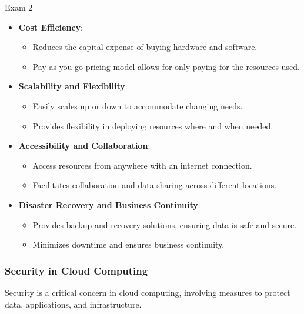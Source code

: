 \begin{examnotes}{Exam 2}
\begin{highlight}
        \begin{itemize}
            \item \textbf{Cost Efficiency}:
                \begin{itemize}
                    \item Reduces the capital expense of buying hardware and software.
                    \item Pay-as-you-go pricing model allows for only paying for the resources used.
                \end{itemize}
            \item \textbf{Scalability and Flexibility}:
                \begin{itemize}
                    \item Easily scales up or down to accommodate changing needs.
                    \item Provides flexibility in deploying resources where and when needed.
                \end{itemize}
            \item \textbf{Accessibility and Collaboration}:
                \begin{itemize}
                    \item Access resources from anywhere with an internet connection.
                    \item Facilitates collaboration and data sharing across different locations.
                \end{itemize}
            \item \textbf{Disaster Recovery and Business Continuity}:
                \begin{itemize}
                    \item Provides backup and recovery solutions, ensuring data is safe and secure.
                    \item Minimizes downtime and ensures business continuity.
                \end{itemize}
        \end{itemize}
    \end{highlight}
    
    \subsubsection*{Security in Cloud Computing}
    
    Security is a critical concern in cloud computing, involving measures to protect data, applications, and infrastructure.
    

\end{examnotes}

